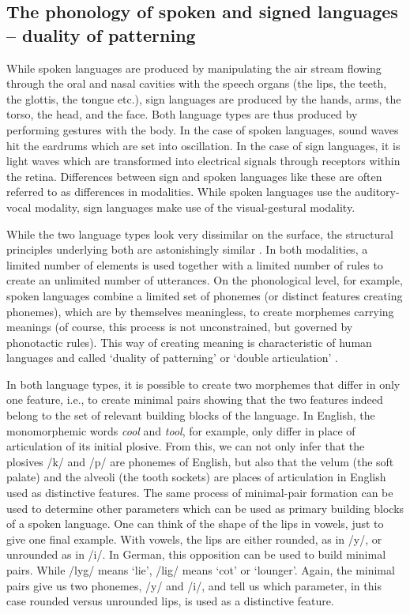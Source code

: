 \subsection{The phonology of spoken and signed languages -- duality of patterning}
While spoken languages are produced by manipulating the air stream flowing through the oral and nasal cavities with the speech organs (the lips, the teeth, the glottis, the tongue etc.), sign languages are produced by the hands, arms, the torso, the head, and the face. Both language types are thus produced by performing gestures with the body. In the case of spoken languages, sound waves hit the eardrums which are set into oscillation. In the case of sign languages, it is light waves which are transformed into electrical signals through receptors within the retina. Differences between sign and spoken languages like these are often referred to as differences in modalities. While spoken languages use the auditory-vocal modality, sign languages make use of the visual-gestural modality. 

While the two language types look very dissimilar on the surface, the structural principles underlying both are astonishingly similar \citep{sandler1989phonology,brentari1998prosodic}. In both modalities, a limited number of elements is used together with a limited number of rules to create an unlimited number of utterances. On the phonological level, for example, spoken languages combine a limited set of phon\-emes (or distinct features creating phonemes), which are by themselves meaningless, to create morphemes carrying meanings (of course, this process is not unconstrained, but governed by phonotactic rules). This way of creating meaning is characteristic of human languages and called `duality of patterning' or `double articulation' \citep{martinet1949double, hockett1960origin}.

In both language types, it is possible to create two morphemes that differ in only one feature, i.e., to create minimal pairs showing that the two features indeed belong to the set of relevant building blocks of the language. In English, the monomorphemic words \textit{cool} and \textit{tool}, for example, only differ in place of articulation of its initial plosive. From this, we can not only infer that the plosives /k/ and /p/ are phonemes of English, but also that the velum (the soft palate) and the alveoli (the tooth sockets) are places of articulation in English used as distinctive features. The same process of minimal-pair formation can be used to determine other parameters which can be used as primary building blocks of a spoken language. One can think of the shape of the lips in vowels, just to give one final example. With vowels, the lips are either rounded, as in /y/, or unrounded as in /i/. In German, this opposition can be used to build minimal pairs. While /ly\textlengthmark g\textschwa / means `lie', /li\textlengthmark g\textschwa / means `cot' or `lounger'. Again, the minimal pairs give us two phonemes, /y\textlengthmark/ and /i\textlengthmark /, and tell us which parameter, in this case rounded versus unrounded lips, is used as a distinctive feature. 

